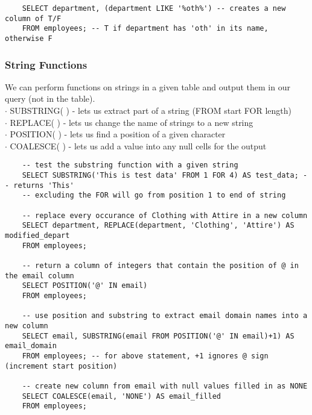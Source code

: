 \documentclass[11pt, a4paper]{article}
\begin{document}
\begin{spacing}{1.1}
\begin{lstlisting}
	SELECT department, (department LIKE '%oth%') -- creates a new column of T/F
	FROM employees; -- T if department has 'oth' in its name, otherwise F \end{lstlisting} \newpage
	\subsubsection{String Functions}
	We can perform functions on strings in a given table and output them in our query (not in the table). \\
	\hspace*{3mm} $\cdot$ SUBSTRING( ) - lets us extract part of a string (FROM start FOR length) \\
	\hspace*{3mm} $\cdot$ REPLACE( ) - lets us change the name of strings to a new string \\
	\hspace*{3mm} $\cdot$ POSITION( ) - lets us find a position of a given character \\
	\hspace*{3mm} $\cdot$ COALESCE( ) - lets us add a value into any null cells for the output
	\begin{lstlisting}
	-- test the substring function with a given string
	SELECT SUBSTRING('This is test data' FROM 1 FOR 4) AS test_data; -- returns 'This'
	-- excluding the FOR will go from position 1 to end of string
	
	-- replace every occurance of Clothing with Attire in a new column
	SELECT department, REPLACE(department, 'Clothing', 'Attire') AS modified_depart
	FROM employees;
	
	-- return a column of integers that contain the position of @ in the email column
	SELECT POSITION('@' IN email)
	FROM employees;
	
	-- use position and substring to extract email domain names into a new column
	SELECT email, SUBSTRING(email FROM POSITION('@' IN email)+1) AS email_domain
	FROM employees; -- for above statement, +1 ignores @ sign (increment start position) 
	
	-- create new column from email with null values filled in as NONE 
	SELECT COALESCE(email, 'NONE') AS email_filled
	FROM employees; \end{lstlisting} \vspace*{1mm}
	

\end{spacing}
\end{document}
